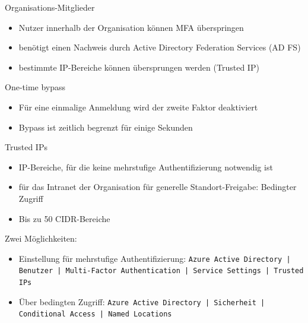 
\begin{flashcard}[Definition]{Organisations-Mitglieder}
    \begin{itemize}
        \item Nutzer innerhalb der Organisation können MFA überspringen
        \item benötigt einen Nachweis durch Active Directory Federation Services (AD FS)
        \item bestimmte IP-Bereiche können übersprungen werden (Trusted IP)
    \end{itemize}
\end{flashcard}

\begin{flashcard}[Definition]{One-time bypass}
    \begin{itemize}
        \item Für eine einmalige Anmeldung wird der zweite Faktor deaktiviert
        \item Bypass ist zeitlich begrenzt für einige Sekunden
    \end{itemize}
\end{flashcard}


\begin{flashcard}[Definition]{Trusted IPs}
    \begin{itemize}
        \item IP-Bereiche, für die keine mehrstufige Authentifizierung notwendig ist
        \item[!] für das Intranet der Organisation\newline
            für generelle Standort-Freigabe: Bedingter Zugriff
        \item Bis zu 50 CIDR-Bereiche
    \end{itemize}
    Zwei Möglichkeiten:
    \begin{itemize}
        \item Einstellung für mehrstufige Authentifizierung:\newline
            \texttt{Azure Active Directory | Benutzer | Multi-Factor Authentication | Service Settings | Trusted IPs}
        \item Über bedingten Zugriff:\newline
            \texttt{Azure Active Directory | Sicherheit | Conditional Access | Named Locations}
    \end{itemize}

\end{flashcard}

